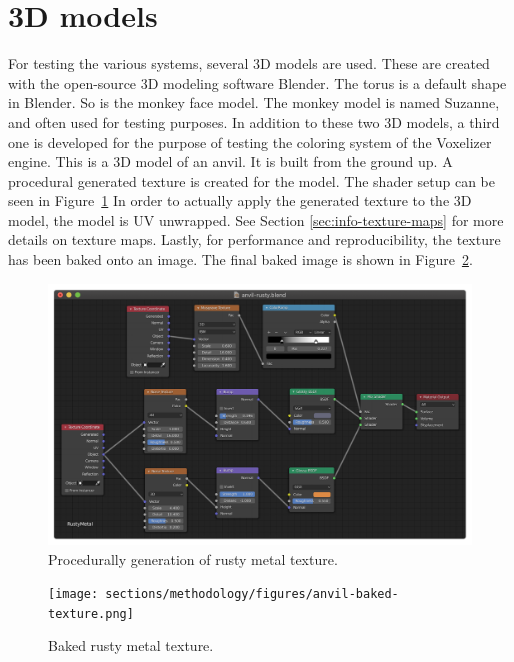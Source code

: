 \section{3D models}
\label{sec:method-3d-models}
For testing the various systems, several 3D models are used. These are created with the open-source 3D modeling software Blender. The torus is a default shape in Blender. So is the monkey face model. The monkey model is named Suzanne, and often used for testing purposes. In addition to these two 3D models, a third one is developed for the purpose of testing the coloring system of the Voxelizer engine. This is a 3D model of an anvil. It is built from the ground up. A procedural generated texture is created for the model. The shader setup can be seen in Figure~\ref{fig:procedural-generated-texture} In order to actually apply the generated texture to the 3D model, the model is UV unwrapped. See Section \ref{sec:info-texture-maps} for more details on texture maps. Lastly, for performance and reproducibility, the texture has been baked onto an image. The final baked image is shown in Figure~\ref{fig:method-anvil-baked-texture}.

\begin{figure}[ht]
    \centering
    \includegraphics[width=\textwidth]{sections/methodology/figures/blender-procedural-texture.png}
    \caption{Procedurally generation of rusty metal texture.}
    \label{fig:procedural-generated-texture}
\end{figure}
\begin{figure}[ht]
    \centering
    \texttt{[image: sections/methodology/figures/anvil-baked-texture.png]}
    \caption{Baked rusty metal texture.}
    \label{fig:method-anvil-baked-texture}
\end{figure}
